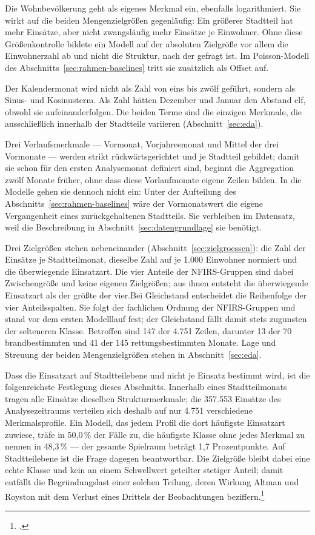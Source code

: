 \documentclass[12pt,a4paper]{article}
\begin{document}
Die Wohnbevölkerung geht als eigenes Merkmal ein, ebenfalls logarithmiert. Sie
wirkt auf die beiden Mengenzielgrößen gegenläufig: Ein größerer Stadtteil hat
mehr Einsätze, aber nicht zwangsläufig mehr Einsätze je Einwohner. Ohne diese
Größenkontrolle bildete ein Modell auf der absoluten Zielgröße vor allem die
Einwohnerzahl ab und nicht die Struktur, nach der gefragt ist. Im
Poisson-Modell des Abschnitts~\ref{sec:rahmen-baselines} tritt sie zusätzlich
als Offset auf.
 
Der Kalendermonat wird nicht als Zahl von eins bis zwölf geführt, sondern als
Sinus- und Kosinusterm. Als Zahl hätten Dezember und Januar den Abstand elf,
obwohl sie aufeinanderfolgen. Die beiden Terme sind die einzigen Merkmale, die
ausschließlich innerhalb der Stadtteile variieren (Abschnitt~\ref{sec:eda}).
 
Drei Verlaufsmerkmale --- Vormonat, Vorjahresmonat und Mittel der drei
Vormonate --- werden strikt rückwärtsgerichtet und je Stadtteil gebildet; damit
sie schon für den ersten Analysemonat definiert sind, beginnt die Aggregation
zwölf Monate früher, ohne dass diese Vorlaufmonate eigene Zeilen bilden. In die
Modelle gehen sie dennoch nicht ein: Unter der Aufteilung des
Abschnitts~\ref{sec:rahmen-baselines} wäre der Vormonatswert die eigene
Vergangenheit eines zurückgehaltenen Stadtteils. Sie verbleiben im Datensatz,
weil die Beschreibung in Abschnitt~\ref{sec:datengrundlage} sie benötigt.
 
Drei Zielgrößen stehen nebeneinander (Abschnitt~\ref{sec:zielgroessen}): die
Zahl der Einsätze je Stadtteilmonat, dieselbe Zahl auf je 1.000 Einwohner
normiert und die überwiegende Einsatzart. Die vier Anteile der NFIRS-Gruppen
sind dabei Zwischengröße und keine eigenen Zielgrößen; aus ihnen entsteht die
überwiegende Einsatzart als der größte der vier.Bei Gleichstand entscheidet die Reihenfolge der vier Anteilsspalten. Sie folgt der fachlichen Ordnung der NFIRS-Gruppen und stand vor dem ersten Modelllauf fest; der Gleichstand fällt damit stets zugunsten der selteneren Klasse. Betroffen sind 147 der 4.751 Zeilen, darunter 13 der 70 brandbestimmten und 41 der 145 rettungsbestimmten Monate. Lage und Streuung der beiden
Mengenzielgrößen stehen in Abschnitt~\ref{sec:eda}.
 
Dass die Einsatzart auf Stadtteilebene und nicht je Einsatz bestimmt wird, ist
die folgenreichste Festlegung dieses Abschnitts. Innerhalb eines
Stadtteilmonats tragen alle Einsätze dieselben Strukturmerkmale; die 357.553
Einsätze des Analysezeitraums verteilen sich deshalb auf nur 4.751 verschiedene
Merkmalsprofile. Ein Modell, das jedem Profil die dort häufigste Einsatzart
zuwiese, träfe in 50,0\,\% der Fälle zu, die häufigste Klasse ohne jedes
Merkmal zu nennen in 48,3\,\% --- der gesamte Spielraum beträgt 1,7
Prozentpunkte. Auf Stadtteilebene ist die Frage dagegen beantwortbar. Die
Zielgröße bleibt dabei eine echte Klasse und kein an einem Schwellwert
geteilter stetiger Anteil; damit entfällt die Begründungslast einer solchen
Teilung, deren Wirkung Altman und Royston mit dem Verlust eines Drittels der
Beobachtungen beziffern.\footcite{Altman2006}
 
\end{document}
